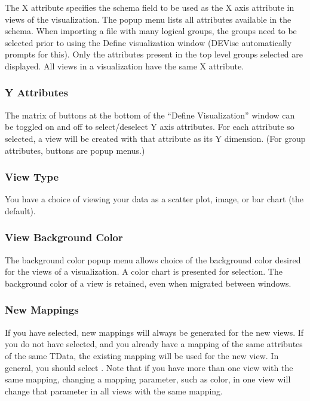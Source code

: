 The X attribute specifies the schema field to be used as the X axis attribute in
views of the visualization. The popup menu lists all attributes available in the
schema. When importing a file with many logical groups, the groups need to be
selected prior to using the Define visualization window (DEVise automatically
prompts for this). Only the attributes present in the top level groups selected
are displayed. All views in a visualization have the same X attribute.

\subsubsection{Y Attributes}

The matrix of buttons at the bottom of the ``Define Visualization'' window can
be toggled on and off to select/deselect Y axis attributes. For each attribute
so selected, a view will be created with that attribute as its Y dimension. (For
group attributes, buttons are popup menus.)

\subsubsection{View Type}

You have a choice of viewing your data as a scatter plot, image, or bar
chart (the default).

\subsubsection{View Background Color}

The background color popup menu allows choice of the background color desired
for the views of a visualization. A color chart is presented for selection. The
background color of a view is retained, even when migrated between windows.

\subsubsection{New Mappings}

If you have  selected, new mappings will always be generated
for the new views.  If you do not have  selected, and
you already have a mapping of the same attributes of the same TData, the
existing mapping will be used for the new view.  In general, you should
select .  Note that if you have more than one view with
the same mapping, changing a mapping parameter, such as color, in one
view will change that parameter in all views with the same mapping.

